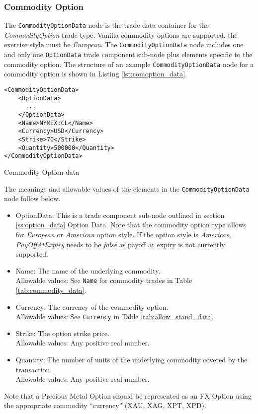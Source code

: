 \subsubsection{Commodity Option}
\label{ss:input_commodity_option}

The \lstinline!CommodityOptionData!  node is the trade data container for the \emph{CommodityOption} trade type.  Vanilla commodity 
options are supported, the exercise style must be \emph{European}. The \lstinline!CommodityOptionData!  node includes one and 
only one \lstinline!OptionData! trade component sub-node plus elements specific to the commodity option. The structure of 
an example \lstinline!CommodityOptionData! node for a commodity option is shown in Listing
\ref{lst:comoption_data}.

\begin{listing}[H]
\begin{verbatim}
<CommodityOptionData>
    <OptionData>
      ...
    </OptionData>
    <Name>NYMEX:CL</Name>
    <Currency>USD</Currency>
    <Strike>70</Strike>
    <Quantity>500000</Quantity>
</CommodityOptionData>
\end{verbatim}
\caption{Commodity Option data}
\label{lst:comoption_data}
\end{listing}

The meanings and allowable values of the elements in the \lstinline!CommodityOptionData!  node follow below.

\begin{itemize}

\item OptionData: This is a trade component sub-node outlined in section \ref{ss:option_data} Option Data. Note that the commodity option type allows for \emph{European} or \emph{American} option style. If the option style is \emph{American}, \emph{PayOffAtExpiry} needs to be \emph{false} as payoff at expiry is not currently supported.
\item Name: The name of the underlying commodity. \\
Allowable values:  See \lstinline!Name! for commodity trades in Table \ref{tab:commodity_data}.
\item Currency: The currency of the commodity option. \\
Allowable values:  See \lstinline!Currency! in Table \ref{tab:allow_stand_data}.
\item Strike: The option strike price.\\
Allowable values:  Any positive real number.
\item Quantity: The number of units of the underlying commodity covered by the transaction. \\
Allowable values:  Any positive real number.
\end{itemize}

Note that a Precious Metal Option should be represented as an FX
Option using the appropriate commodity ``currency'' (XAU, XAG, XPT, XPD).
